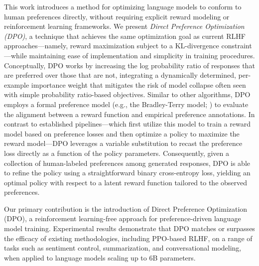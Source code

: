 This work introduces a method for optimizing language models to conform to human preferences directly, without requiring explicit reward modeling or reinforcement learning frameworks. We present \textit{{Direct Preference Optimization} (DPO)}, a technique that achieves the same optimization goal as current RLHF approaches—namely, reward maximization subject to a KL-divergence constraint—while maintaining ease of implementation and simplicity in training procedures. Conceptually, DPO works by increasing the log probability ratio of responses that are preferred over those that are not, integrating a dynamically determined, per-example importance weight that mitigates the risk of model collapse often seen with simple probability ratio-based objectives. Similar to other algorithms, DPO employs a formal preference model (e.g., the Bradley-Terry model; \cite{bradley1952rankanalysis}) to evaluate the alignment between a reward function and empirical preference annotations. In contrast to established pipelines—which first utilize this model to train a reward model based on preference losses and then optimize a policy to maximize the reward model—DPO leverages a variable substitution to recast the preference loss directly as a function of the policy parameters. Consequently, given a collection of human-labeled preferences among generated responses, DPO is able to refine the policy using a straightforward binary cross-entropy loss, yielding an optimal policy with respect to a latent reward function tailored to the observed preferences.

Our primary contribution is the introduction of Direct Preference Optimization (DPO), a reinforcement learning-free approach for preference-driven language model training. Experimental results demonstrate that DPO matches or surpasses the efficacy of existing methodologies, including PPO-based RLHF, on a range of tasks such as sentiment control, summarization, and conversational modeling, when applied to language models scaling up to 6B parameters.

